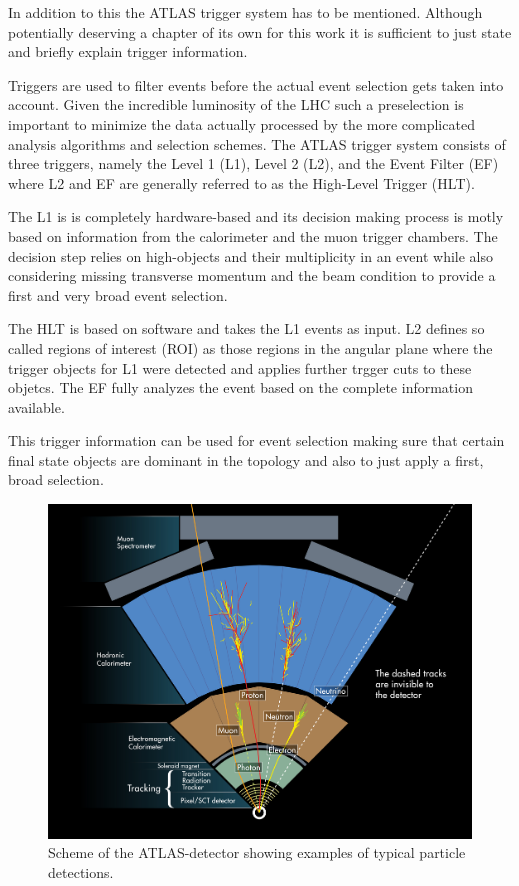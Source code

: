 In addition to this the ATLAS trigger system has to be mentioned. Although potentially deserving a chapter of its own for this work it is sufficient to just state  and briefly explain trigger information.

Triggers are used to filter events before the actual event selection gets taken into account. Given the incredible luminosity of the LHC such a preselection is important to minimize the data actually processed by the more complicated analysis algorithms and selection schemes.
The ATLAS trigger system consists of three triggers, namely the Level 1 (L1), Level 2 (L2), and the Event Filter (EF) where L2 and EF are generally referred to as the High-Level Trigger (HLT).

The L1 is is completely hardware-based and its decision making process is motly based on information from the calorimeter and the muon trigger chambers. The decision step relies on high-\pT objects and their multiplicity in an event while also considering missing transverse momentum and the beam condition to provide a first and very broad event selection.

The HLT is based on software and takes the L1 events as input. L2 defines so called regions of interest (ROI) as those regions in the angular plane where the trigger objects for L1 were detected and applies further trgger cuts to these objetcs.
The EF fully analyzes the event based on the complete information available.

This trigger information can be used for event selection making sure that certain final state objects are dominant in the topology and also to just apply a first, broad selection.



\begin{figure}[htbp]
  \centering
  \includegraphics[scale=0.6]{figures_LHC/atlas-abstract}
  \caption[Scheme of the ATLAS-detector's detection procedure]{Scheme of the ATLAS-detector showing examples of typical particle detections. \cite{Pequenao:1095924}}
  \label{fig:atlas_sketch}
\end{figure}


